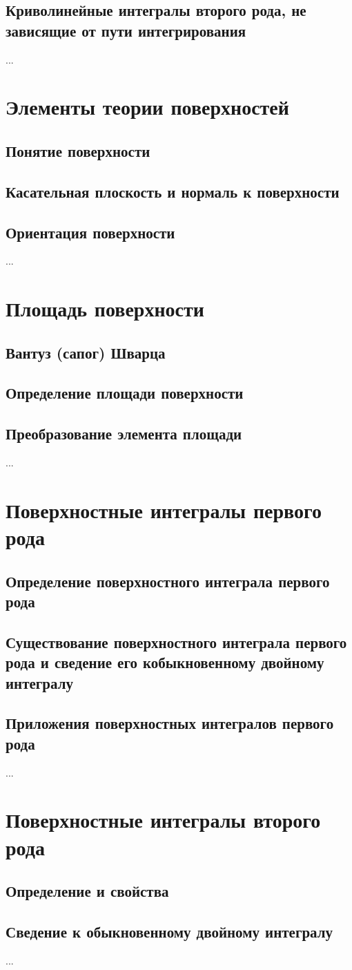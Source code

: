 \subsection{Криволинейные интегралы второго рода, не зависящие от пути интегрирования}
...

\section{Элементы теории поверхностей}
\subsection{Понятие поверхности}
\subsection{Касательная плоскость и нормаль к поверхности}
\subsection{Ориентация поверхности}
...

\section{Площадь поверхности}
\subsection{Вантуз (сапог) Шварца}
\subsection{Определение площади поверхности}
\subsection{Преобразование элемента площади}
...

\section{Поверхностные интегралы первого рода}
\subsection{Определение поверхностного интеграла первого рода}
\subsection{Существование поверхностного интеграла первого рода и сведение его кобыкновенному двойному интегралу}
\subsection{Приложения поверхностных интегралов первого рода}
...

\section{Поверхностные интегралы второго рода}
\subsection{Определение и свойства}
\subsection{Сведение к обыкновенному двойному интегралу}
...


